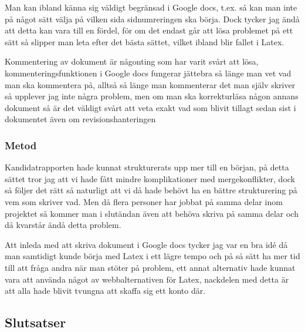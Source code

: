 Man kan ibland känna sig väldigt begränsad i Google docs, t.ex. så kan man inte på något sätt välja på vilken sida sidnumreringen ska börja. Dock tycker jag ändå att detta kan vara till en fördel, för om det endast går att lösa problemet på ett sätt så slipper man leta efter det bästa sättet, vilket ibland blir fallet i Latex.


Kommentering av dokument är någonting som har varit svårt att lösa, kommenteringsfunktionen i Google docs fungerar jättebra så länge man vet vad man ska kommentera på, alltså så länge man kommenterar det man själv skriver så upplever jag inte några problem, men om man ska korrekturläsa någon annans dokument så är det väldigt svårt att veta exakt vad som blivit tillagt sedan sist i dokumentet även om revisionshanteringen


\subsubsection{Metod}
Kandidatrapporten hade kunnat strukturerats upp mer till en början, på detta sättet tror jag att vi hade fått mindre komplikationer med mergekonflikter, dock så följer det rätt så naturligt att vi då hade behövt ha en bättre strukturering på vem som skriver vad. Men då flera personer har jobbat på samma delar inom projektet så kommer man i slutändan även att behöva skriva på samma delar och då kvarstår ändå detta problem.

Att inleda med att skriva dokument i Google docs tycker jag var en bra idé då man samtidigt kunde börja med Latex i ett lägre tempo och på så sätt ha mer tid till att fråga andra när man stöter på problem, ett annat alternativ hade kunnat vara att använda något av webbalternativen för Latex, nackdelen med detta är att alla hade blivit tvungna att skaffa sig ett konto där.

\subsection{Slutsatser}
